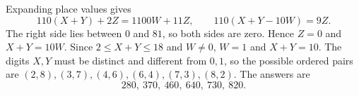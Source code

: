 Expanding place values gives
\[
110(X+Y)+2Z=1100W+11Z,\qquad110(X+Y-10W)=9Z.
\]
The right side lies between $0$ and $81$, so both sides are zero. Hence $Z=0$ and $X+Y=10W$. Since $2\le X+Y\le18$ and $W\ne0$, $W=1$ and $X+Y=10$. The digits $X,Y$ must be distinct and different from $0,1$, so the possible ordered pairs are $(2,8),(3,7),(4,6),(6,4),(7,3),(8,2)$. The answers are
\[
\boxed{280,\ 370,\ 460,\ 640,\ 730,\ 820}.
\]
